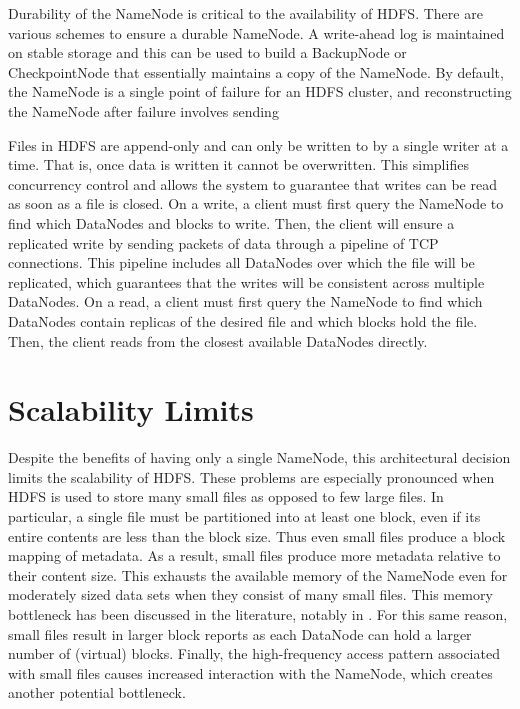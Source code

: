 \documentclass[11pt, a4paper]{article}
\begin{document}
\begin{multicols*}{2}
Durability of the NameNode is critical to the availability of HDFS. There are various schemes to ensure a durable NameNode. A write-ahead log is maintained on stable storage and this can be used to build a BackupNode or CheckpointNode that essentially maintains a copy of the NameNode. By default, the NameNode is a single point of failure for an HDFS cluster, and reconstructing the NameNode after failure involves sending 

Files in HDFS are append-only and can only be written to by a single writer at a time. That is, once data is written it cannot be overwritten. This simplifies concurrency control and allows the system to guarantee that writes can be read as soon as a file is closed. On a write, a client must first query the NameNode to find which DataNodes and blocks to write. Then, the client will ensure a replicated write by sending packets of data through a pipeline of TCP connections. This pipeline includes all DataNodes over which the file will be replicated, which guarantees that the writes will be consistent across multiple DataNodes. On a read, a client must first query the NameNode to find which DataNodes contain replicas of the desired file and which blocks hold the file. Then, the client reads from the closest available DataNodes directly.

\section{Scalability Limits}\label{ScalabilityLimits}
Despite the benefits of having only a single NameNode, this architectural decision limits the scalability of HDFS. These problems are especially pronounced when HDFS is used to store many small files as opposed to few large files. In particular, a single file must be partitioned into at least one block, even if its entire contents are less than the block size. Thus even small files produce a block mapping of metadata. As a result, small files produce more metadata relative to their content size. This exhausts the available memory of the NameNode even for moderately sized data sets when they consist of many small files. This memory bottleneck has been discussed in the literature, notably in \cite{HdfsScale}. For this same reason, small files result in larger block reports as each DataNode can hold a larger number of (virtual) blocks. Finally, the high-frequency access pattern associated with small files causes increased interaction with the NameNode, which creates another potential bottleneck.


\end{multicols*}
\end{document}
